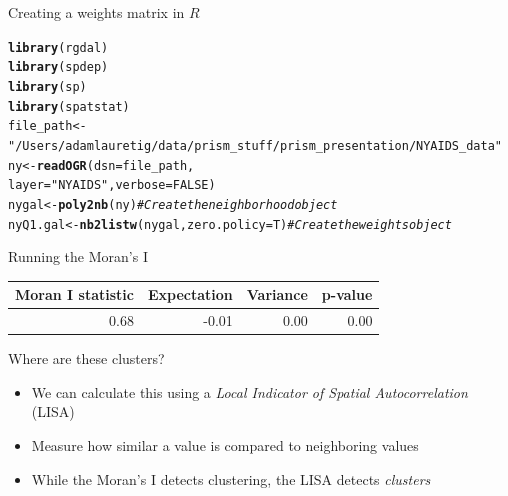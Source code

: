 \documentclass[aspectratio = 169, 12pt]{beamer}\usepackage[]{graphicx}\usepackage[]{color}
\makeatletter
\newcommand{\hlnum}[1]{\textcolor[rgb]{0.686,0.059,0.569}{#1}}%
\newcommand{\hlstr}[1]{\textcolor[rgb]{0.192,0.494,0.8}{#1}}%
\newcommand{\hlcom}[1]{\textcolor[rgb]{0.678,0.584,0.686}{\textit{#1}}}%
\newcommand{\hlstd}[1]{\textcolor[rgb]{0.345,0.345,0.345}{#1}}%
\newcommand{\hlkwb}[1]{\textcolor[rgb]{0.69,0.353,0.396}{#1}}%
\newcommand{\hlkwc}[1]{\textcolor[rgb]{0.333,0.667,0.333}{#1}}%
\newcommand{\hlkwd}[1]{\textcolor[rgb]{0.737,0.353,0.396}{\textbf{#1}}}%
\newenvironment{kframe}{%
 \def\at@end@of@kframe{}%
 \ifinner\ifhmode%
  \def\at@end@of@kframe{\end{minipage}}%
  \begin{minipage}{\columnwidth}%
 \fi\fi%
 \def\FrameCommand##1{\hskip\@totalleftmargin \hskip-\fboxsep
 \colorbox{shadecolor}{##1}\hskip-\fboxsep
     \hskip-\linewidth \hskip-\@totalleftmargin \hskip\columnwidth}%
 \MakeFramed {\advance\hsize-\width
   \@totalleftmargin\z@ \linewidth\hsize
   \@setminipage}}%
 {\par\unskip\endMakeFramed%
 \at@end@of@kframe}
\newenvironment{knitrout}{}{} %
\makeatother
\begin{document}
\begin{frame}[fragile]{Creating a weights matrix in $R$}
\begin{knitrout}\tiny
{}\color{fgcolor}\begin{kframe}
\begin{alltt}
\hlkwd{library}\hlstd{(rgdal)}
\hlkwd{library}\hlstd{(spdep)}
\hlkwd{library}\hlstd{(sp)}
\hlkwd{library}\hlstd{(spatstat)}
\hlstd{file_path} \hlkwb{<-} \hlstr{"/Users/adamlauretig/data/prism_stuff/prism_presentation/NYAIDS_data"}
\hlstd{ny} \hlkwb{<-} \hlkwd{readOGR}\hlstd{(}\hlkwc{dsn} \hlstd{= file_path,}
              \hlkwc{layer} \hlstd{=} \hlstr{"NYAIDS"}\hlstd{,} \hlkwc{verbose}\hlstd{=}\hlnum{FALSE}\hlstd{)}
\hlstd{nygal} \hlkwb{<-} \hlkwd{poly2nb}\hlstd{(ny)} \hlcom{#Create the neighborhood object}
\hlstd{nyQ1.gal} \hlkwb{<-} \hlkwd{nb2listw}\hlstd{(nygal,} \hlkwc{zero.policy}\hlstd{=T)} \hlcom{#Create the weights object}
\end{alltt}
\end{kframe}
\end{knitrout}
\end{frame}

\begin{frame}[fragile]{Running the Moran's I}
\begin{table}[ht]
\centering
\begin{tabular}{rrrr}
  \hline
Moran I statistic & Expectation & Variance & p-value \\ 
  \hline
0.68 & -0.01 & 0.00 & 0.00 \\ 
   \hline
\end{tabular}
\label{tab:moranresid}
\end{table}

\end{frame}

\begin{frame}{Where are these clusters?}
\begin{itemize}
\item We can calculate this using a \textit{Local Indicator of Spatial Autocorrelation} (LISA)
\item Measure how similar a value is compared to neighboring values
\item While the Moran's I detects clustering, the LISA detects \textit{clusters}
\end{itemize}
\end{frame}
\end{document}
